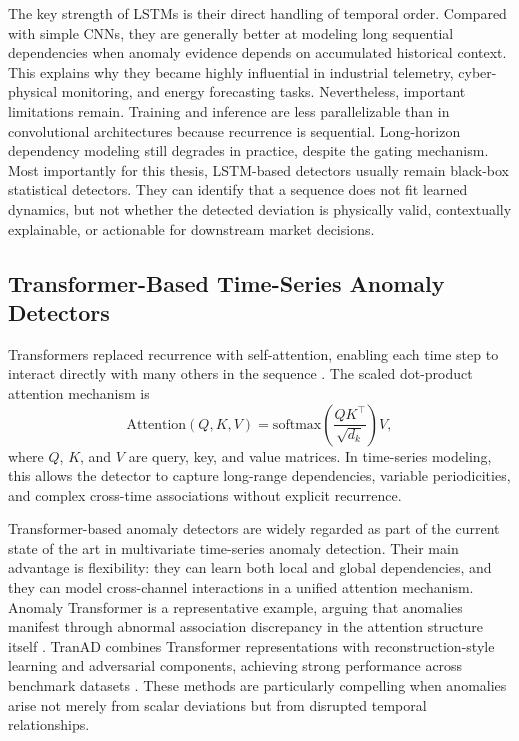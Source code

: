 The key strength of LSTMs is their direct handling of temporal order. Compared with simple CNNs, they are generally better at modeling long sequential dependencies when anomaly evidence depends on accumulated historical context. This explains why they became highly influential in industrial telemetry, cyber-physical monitoring, and energy forecasting tasks. Nevertheless, important limitations remain. Training and inference are less parallelizable than in convolutional architectures because recurrence is sequential. Long-horizon dependency modeling still degrades in practice, despite the gating mechanism. Most importantly for this thesis, LSTM-based detectors usually remain black-box statistical detectors. They can identify that a sequence does not fit learned dynamics, but not whether the detected deviation is physically valid, contextually explainable, or actionable for downstream market decisions.

\subsection{Transformer-Based Time-Series Anomaly Detectors}

Transformers replaced recurrence with self-attention, enabling each time step to interact directly with many others in the sequence \cite{vaswani2017attention}. The scaled dot-product attention mechanism is
\begin{equation}
	\mathrm{Attention}(Q,K,V) = \mathrm{softmax}\!\left(\frac{QK^{\top}}{\sqrt{d_k}}\right)V,
	\label{eq:sota_attention}
\end{equation}
where $Q$, $K$, and $V$ are query, key, and value matrices. In time-series modeling, this allows the detector to capture long-range dependencies, variable periodicities, and complex cross-time associations without explicit recurrence.

Transformer-based anomaly detectors are widely regarded as part of the current state of the art in multivariate time-series anomaly detection. Their main advantage is flexibility: they can learn both local and global dependencies, and they can model cross-channel interactions in a unified attention mechanism. Anomaly Transformer is a representative example, arguing that anomalies manifest through abnormal association discrepancy in the attention structure itself \cite{xu2022anomalytransformer}. TranAD combines Transformer representations with reconstruction-style learning and adversarial components, achieving strong performance across benchmark datasets \cite{tuli2022tranad}. These methods are particularly compelling when anomalies arise not merely from scalar deviations but from disrupted temporal relationships.

